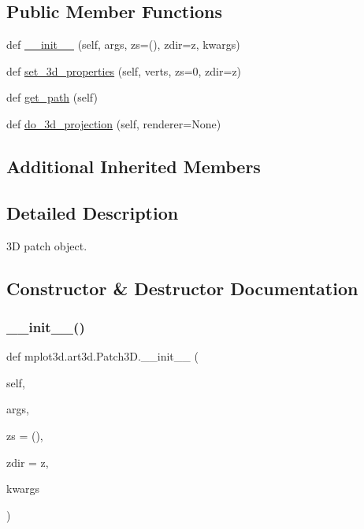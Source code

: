 \subsection*{Public Member Functions}
\begin{DoxyCompactItemize}
\item 
def \hyperlink{classmplot3d_1_1art3d_1_1Patch3D_af93955c105f176c84e3be8e67ed893bb}{\+\_\+\+\_\+init\+\_\+\+\_\+} (self, args, zs=(), zdir=\textquotesingle{}z\textquotesingle{}, kwargs)
\item 
def \hyperlink{classmplot3d_1_1art3d_1_1Patch3D_a788d729757b64afa0894e2781c094621}{set\+\_\+3d\+\_\+properties} (self, verts, zs=0, zdir=\textquotesingle{}z\textquotesingle{})
\item 
def \hyperlink{classmplot3d_1_1art3d_1_1Patch3D_a67b7406b2fba5425ba214888082ccb30}{get\+\_\+path} (self)
\item 
def \hyperlink{classmplot3d_1_1art3d_1_1Patch3D_a1a01ce39f3772b0b6cf95b3bfddbb855}{do\+\_\+3d\+\_\+projection} (self, renderer=None)
\end{DoxyCompactItemize}
\subsection*{Additional Inherited Members}


\subsection{Detailed Description}
\begin{DoxyVerb}3D patch object.
\end{DoxyVerb}
 

\subsection{Constructor \& Destructor Documentation}
\mbox{\label{classmplot3d_1_1art3d_1_1Patch3D_af93955c105f176c84e3be8e67ed893bb}} 
\subsubsection{\texorpdfstring{\+\_\+\+\_\+init\+\_\+\+\_\+()}{\_\_init\_\_()}}
{\footnotesize\ttfamily def mplot3d.\+art3d.\+Patch3\+D.\+\_\+\+\_\+init\+\_\+\+\_\+ (\begin{DoxyParamCaption}\item[{}]{self,  }\item[{}]{args,  }\item[{}]{zs = {\ttfamily ()},  }\item[{}]{zdir = {\ttfamily \textquotesingle{}z\textquotesingle{}},  }\item[{}]{kwargs }\end{DoxyParamCaption})}



